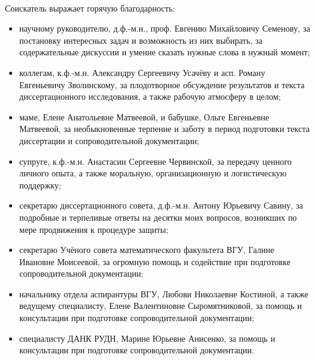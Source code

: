 

~~


Соискатель выражает горячую благодарность:
\begin{itemize}
	\item
		научному руководителю, д.ф.-м.н., проф. Евгению Михайловичу Семенову,
		за
		постановку интересных задач и возможность из них выбирать,
		за
		содержательные дискуссии
		и умение сказать нужные слова в нужный момент;
	\item
		коллегам, к.ф.-м.н. Александру Сергеевичу Усачёву и асп. Роману Евгеньевичу Зволинскому,
		за
		плодотворное обсуждение результатов и текста диссертационного исследования,
		а также рабочую атмосферу в целом;
	\item
		маме, Елене Анатольевне Матвеевой,
		и бабушке, Ольге Евгеньевне Матвеевой,
		за необыкновенные терпение и заботу
		в период подготовки текста диссертации и сопроводительной документации;
	\item
		супруге, к.ф.-м.н. Анастасии Сергеевне Червинской,
		за
		передачу ценного личного опыта,
		а также моральную, организационную и логистическую поддержку;
	\item
		секретарю диссертационного совета, д.ф.-м.н. Антону Юрьевичу Савину,
		за подробные и терпеливые ответы на десятки моих вопросов, возникших по мере продвижения к процедуре защиты;
	\item
		секретарю Учёного совета математического факультета ВГУ, Галине Ивановне Моисеевой,
		за
		огромную помощь и содействие при подготовке сопроводительной документации;
	\item
		начальнику отдела аспирантуры ВГУ, Любови Николаевне Костиной, а также ведущему специалисту, Елене Валентиновне Сыромятниковой,
		за
		помощь и консультации при подготовке сопроводительной документации;
	\item
		специалисту ДАНК РУДН, Марине Юрьевне Анисенко,
		за
		помощь и консультации при подготовке сопроводительной документации.
\end{itemize}
